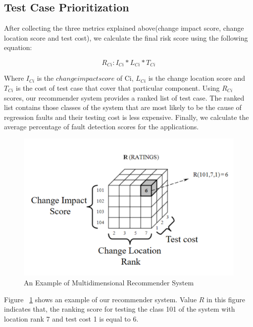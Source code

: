 \subsection{Test Case Prioritization}

	After collecting the three metrics explained above(change impact score, change
	location score and test cost), we calculate the final risk score using
	the following equation:
	
	\[
	{ R_{Ci} : I_{Ci} * L_{Ci} * T_{Ci}}	
	\]
	
	Where $I_{Ci}$ is the
	$change impact score$ of Ci, $L_{Ci}$ is the change location score 
	and $T_{Ci}$ is the cost of test case that cover 
	that particular component.
	Using $R_{Ci}$ scores, our recommender system provides a ranked
	list of test case. The ranked list contains those
	classes of the system that are most likely to be the cause of
	regression faults and their testing cost is less expensive. 
	Finally, we calculate the average percentage of fault detection
	scores for the applications.


\begin{figure}[hb]
	\centering
	\includegraphics[width=0.75\linewidth]{./RM.png}
	\vspace*{3pt}
	\caption{An Example of Multidimensional Recommender System}
	\label{fig:rm}
\end{figure}


Figure ~\ref{fig:rm} shows an example of our recommender system.
Value $R$ in this figure indicates that, the ranking score for 
testing the class 101 of the system with location rank 7 and test
cost 1 is equal to 6. 


